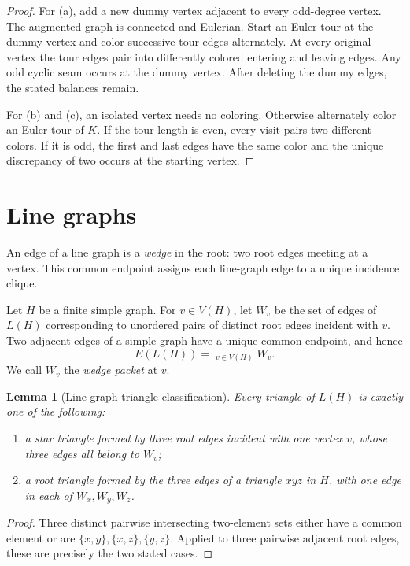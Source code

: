 \documentclass[11pt]{article}
\newtheorem{lemma}[theorem]{Lemma}
\theoremstyle{remark}
\newcommand{\dd}{\mathbin{\dot\cup}}
\begin{document}
\begin{proof}
For (a), add a new dummy vertex adjacent to every odd-degree vertex.  The
augmented graph is connected and Eulerian.  Start an Euler tour at the dummy
vertex and color successive tour edges alternately.  At every original vertex
the tour edges pair into differently colored entering and leaving edges.  Any
odd cyclic seam occurs at the dummy vertex.  After deleting the dummy edges,
the stated balances remain.

For (b) and (c), an isolated vertex needs no coloring.  Otherwise alternately
color an Euler tour of $K$.  If the tour length is even, every visit pairs two
different colors.  If it is odd, the first and
last edges have the same color and the unique discrepancy of two occurs at
the starting vertex.
\end{proof}

\section{Line graphs}\label{sec:line}

An edge of a line graph is a \emph{wedge} in the root: two root edges
meeting at a vertex.  This common endpoint assigns each line-graph edge to
a unique incidence clique.

Let $H$ be a finite simple graph.  For $v\in V(H)$, let $W_v$ be the set of
edges of $L(H)$ corresponding to unordered pairs of distinct root edges
incident with $v$.  Two adjacent edges of a simple graph have a unique common
endpoint, and hence
\begin{equation}\label{eq:wedge-partition}
  E(L(H))=\mathop{\dd}_{v\in V(H)}W_v.
\end{equation}
We call $W_v$ the \emph{wedge packet} at $v$.

\begin{lemma}[Line-graph triangle classification]\label{lem:line-class}
Every triangle of $L(H)$ is exactly one of the following:
\begin{enumerate}[label=\textup{(\roman*)}]
  \item a star triangle formed by three root edges incident with one vertex
        $v$, whose three edges all belong to $W_v$;
  \item a root triangle formed by the three edges of a triangle $xyz$ in
        $H$, with one edge in each of $W_x,W_y,W_z$.
\end{enumerate}
\end{lemma}

\begin{proof}
Three distinct pairwise intersecting two-element sets either have a common
element or are $\{x,y\},\{x,z\},\{y,z\}$.  Applied to three pairwise adjacent
root edges, these are precisely the two stated cases.
\end{proof}
\end{document}
